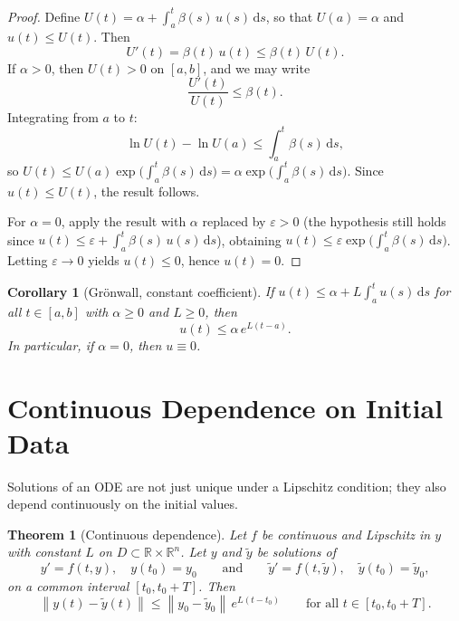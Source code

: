 \documentclass[12pt,a4paper,openany]{book}
\theoremstyle{definition}
\theoremstyle{plain}
\newtheorem{theorem}[definition]{Theorem}
\newtheorem{corollary}[definition]{Corollary}
\theoremstyle{remark}
\newcommand{\R}{\mathbb{R}}
\newcommand{\dd}{\mathrm{d}}
\newcommand{\norm}[1]{\left\|#1\right\|}
\begin{document}
\begin{proof}
Define $U(t) = \alpha + \displaystyle\int_a^t \beta(s)\,u(s)\,\dd s$, so that
$U(a) = \alpha$ and $u(t) \le U(t)$. Then
\[
  U'(t) = \beta(t)\,u(t) \le \beta(t)\,U(t).
\]
If $\alpha > 0$, then $U(t) > 0$ on $[a,b]$, and we may write
\[
  \frac{U'(t)}{U(t)} \le \beta(t).
\]
Integrating from $a$ to $t$:
\[
  \ln U(t) - \ln U(a) \le \int_a^t \beta(s)\,\dd s,
\]
so $U(t) \le U(a) \exp\!\bigl(\int_a^t \beta(s)\,\dd s\bigr)
= \alpha \exp\!\bigl(\int_a^t \beta(s)\,\dd s\bigr)$.
Since $u(t) \le U(t)$, the result follows.

For $\alpha = 0$, apply the result with $\alpha$ replaced by $\varepsilon > 0$
(the hypothesis still holds since $u(t) \le \varepsilon + \int_a^t \beta(s)\,u(s)\,\dd s$), obtaining
$u(t) \le \varepsilon\exp\!\bigl(\int_a^t \beta(s)\,\dd s\bigr)$. Letting
$\varepsilon \to 0$ yields $u(t) \le 0$, hence $u(t) = 0$.
\end{proof}

\begin{corollary}[Gr\"onwall, constant coefficient]\label{cor:gronwall-const}
If $u(t) \le \alpha + L\displaystyle\int_a^t u(s)\,\dd s$ for all $t \in [a,b]$
with $\alpha \ge 0$ and $L \ge 0$, then
\[
  u(t) \le \alpha\,e^{L(t-a)}.
\]
In particular, if $\alpha = 0$, then $u \equiv 0$.
\end{corollary}

\section{Continuous Dependence on Initial Data}\label{sec:continuous-dependence}

Solutions of an ODE are not just unique under a Lipschitz condition; they also
depend continuously on the initial values.

\begin{theorem}[Continuous dependence]\label{thm:continuous-dependence}
Let $f$ be continuous and Lipschitz in $y$ with constant $L$ on
$D \subset \R \times \R^n$. Let $y$ and $\tilde{y}$ be solutions of
\[
  y' = f(t,y),\quad y(t_0)=y_0
  \qquad\text{and}\qquad
  \tilde{y}' = f(t,\tilde{y}),\quad \tilde{y}(t_0) = \tilde{y}_0,
\]
on a common interval $[t_0, t_0 + T]$. Then
\begin{equation}\label{eq:cont-dep}
  \norm{y(t) - \tilde{y}(t)} \le \norm{y_0 - \tilde{y}_0}\,e^{L(t-t_0)}
  \qquad \text{for all } t \in [t_0, t_0 + T].
\end{equation}
\end{theorem}
\end{document}
